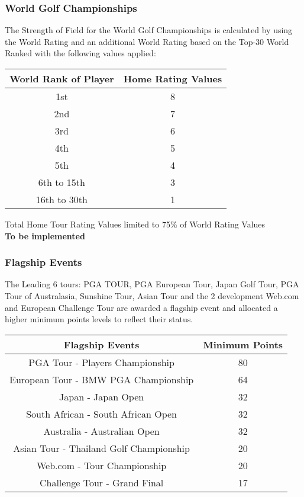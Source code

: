 \documentclass{article}
\begin{document}
\subsubsection{World Golf Championships}

The Strength of Field for the World Golf Championships is calculated by using the World Rating and an additional World Rating based on the Top-30 World Ranked with the following values applied:
\begin{center}
\begin{tabular}{ | c | c | }
\hline
World Rank of Player&	Home Rating Values\\
\hline
1st	&8\\
2nd	&7\\
3rd	&6\\
4th	&5\\
5th	&4\\
6th to 15th	&3\\
16th to 30th	&1\\
\hline
\end{tabular}
\end{center}

Total Home Tour Rating Values limited to 75\% of World Rating Values\\
\textbf{\color{orange} To be implemented}

\subsubsection{Flagship Events}

The Leading 6 tours:  PGA TOUR, PGA European Tour, Japan Golf Tour, PGA Tour of Australasia, Sunshine Tour, Asian Tour and the 2 development Web.com and European Challenge Tour are awarded a flagship event and allocated a higher minimum points levels to reflect their status.

\begin{center}
\begin{tabular}{ | c | c | }
\hline
Flagship Events	&Minimum Points\\
\hline
PGA Tour - Players Championship	&80\\
European Tour - BMW PGA Championship&	64\\
Japan - Japan Open	&32\\
South African - South African Open	&32\\
Australia - Australian Open	&32\\
Asian Tour - Thailand Golf Championship	&20\\
Web.com - Tour Championship	&20\\
Challenge Tour - Grand Final	&17\\
\hline
\end{tabular}
\end{center}
\end{document}
